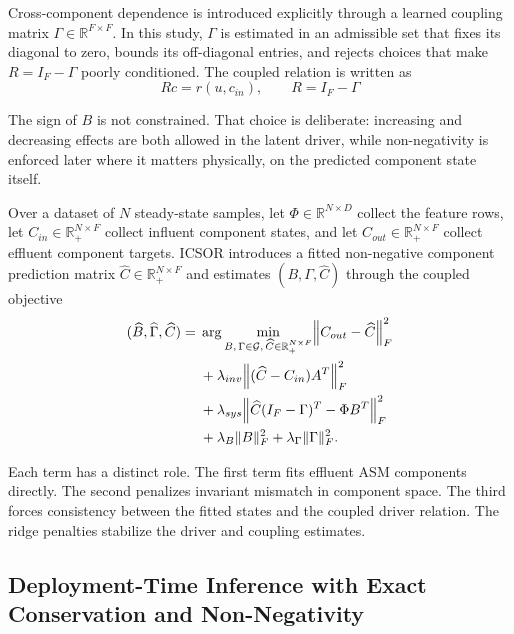 \documentclass[a4paper,fleqn]{cas-sc}
\newenvironment{revblock}{\begingroup\color{revDefault}}{\endgroup}
\begin{document}
\begin{revblock}
Cross-component dependence is introduced explicitly through a learned coupling matrix $\Gamma \in \mathbb{R}^{F \times F}$. In this study, $\Gamma$ is estimated in an admissible set that fixes its diagonal to zero, bounds its off-diagonal entries, and rejects choices that make $R = I_F - \Gamma$ poorly conditioned. The coupled relation is written as
\begin{equation}
\label{eq:coupled-relation}
 R c = r(u, c_{in}), \qquad R = I_F - \Gamma
\end{equation}

The sign of $B$ is not constrained. That choice is deliberate: increasing and decreasing effects are both allowed in the latent driver, while non-negativity is enforced later where it matters physically, on the predicted component state itself.

Over a dataset of $N$ steady-state samples, let $\Phi \in \mathbb{R}^{N \times D}$ collect the feature rows, let $C_{in} \in \mathbb{R}_{+}^{N \times F}$ collect influent component states, and let $C_{out} \in \mathbb{R}_{+}^{N \times F}$ collect effluent component targets. ICSOR introduces a fitted non-negative component prediction matrix $\widehat{C} \in \mathbb{R}_{+}^{N \times F}$ and estimates $(B, \Gamma, \widehat{C})$ through the coupled objective
\begin{equation}
\label{eq:training-objective}
\begin{aligned}
(\widehat{B}, \widehat{\Gamma}, \widehat{C}) = {}&
\arg\min_{B,\, \Gamma \in \mathcal{G},\, \widehat{C} \in \mathbb{R}_{+}^{N \times F}}
\Bigl\|
C_{out} - \widehat{C}
\Bigr\|_F^2 \\
&+ \lambda_{inv}
\Bigl\|
(\widehat{C} - C_{in})A^T
\Bigr\|_F^2 \\
&+ \lambda_{sys}
\Bigl\|
\widehat{C}(I_F - \Gamma)^T - \Phi B^T
\Bigr\|_F^2 \\
&+ \lambda_B \|B\|_F^2
+ \lambda_\Gamma \|\Gamma\|_F^2.
\end{aligned}
\end{equation}

Each term has a distinct role. The first term fits effluent ASM components directly. The second penalizes invariant mismatch in component space. The third forces consistency between the fitted states and the coupled driver relation. The ridge penalties stabilize the driver and coupling estimates.

\subsection{Deployment-Time Inference with Exact Conservation and Non-Negativity}


\end{revblock}
\end{document}
